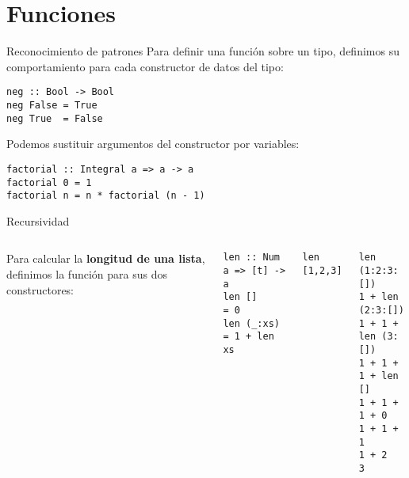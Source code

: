 \section{Funciones}

\begin{frame}[fragile]{Reconocimiento de patrones}
  Para definir una función sobre un tipo, definimos su comportamiento para cada
  constructor de datos del tipo:
  \begin{lstlisting}
neg :: Bool -> Bool
neg False = True
neg True  = False
  \end{lstlisting}

  \espacio

  Podemos sustituir argumentos del constructor por variables:
  \begin{lstlisting}
factorial :: Integral a => a -> a
factorial 0 = 1
factorial n = n * factorial (n - 1)
  \end{lstlisting}

\end{frame}

\begin{frame}[fragile]{Recursividad}

  \begin{columns}
  Para calcular la \textbf{longitud de una lista}, definimos la función para sus dos
  constructores:

  \espacio
  \begin{lstlisting}
len :: Num a => [t] -> a
len []     = 0
len (_:xs) = 1 + len xs
  \end{lstlisting}
\texttt{len [1,2,3]}
  \begin{lstlisting}
len (1:2:3:[])
1 + len (2:3:[])
1 + 1 + len (3:[])
1 + 1 + 1 + len []
1 + 1 + 1 + 0
1 + 1 + 1
1 + 2
3
  \end{lstlisting}
\end{columns}
\end{frame}

